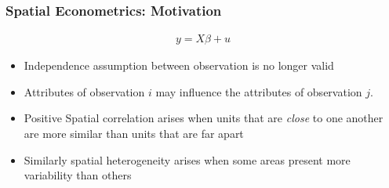 \documentclass[
  shownotes,
  xcolor={svgnames},
  hyperref={colorlinks,citecolor=DarkBlue,linkcolor=DarkRed,urlcolor=DarkBlue}
   , aspectratio=169]{beamer}
\begin{document}
\begin{frame}[fragile]
\begin{minipage}[t]{0.43\linewidth}
\begin{figure}[H]
 \end{figure}
    \end{minipage}

\end{frame}


\begin{frame}[fragile]
\frametitle{Spatial Econometrics: Motivation}


    \begin{minipage}[t]{0.52\linewidth}

\begin{align}
        y = X\beta + u \nonumber
    \end{align}

\begin{itemize}
    
  \small
  \item Independence assumption between observation is no longer valid
  
  \item Attributes of observation $i$  may influence the attributes of observation $j$.
  
  \item Positive Spatial correlation arises when units that are {\it close} to one another are more similar than units that are far apart
  
  \item Similarly spatial heterogeneity arises when some areas present more variability than others
\end{itemize}


\end{minipage}
\end{frame}
\end{document}
